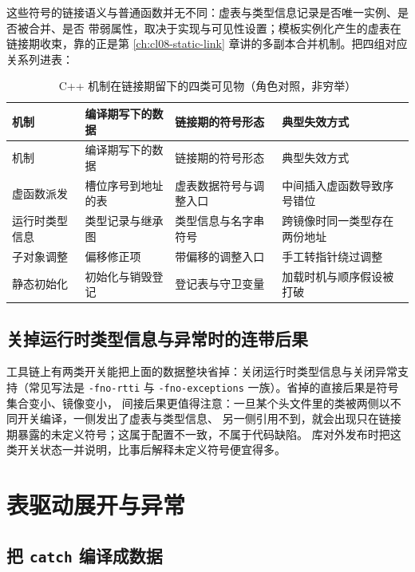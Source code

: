 \documentclass[12pt,a4paper,fontset=fandol]{ctexbook}
\newcommand{\Tp}[1]{\texttt{#1}}
\newcommand{\Lang}[1]{\textsf{#1}}
\newcommand{\CPP}{\Lang{C++}}
\newcommand{\Sw}[1]{\texttt{#1}}
\begin{document}
这些符号的链接语义与普通函数并无不同：虚表与类型信息记录是否唯一实例、是否被合并、是否
带弱属性，取决于实现与可见性设置；模板实例化产生的虚表在链接期收束，靠的正是第
\ref{ch:cl08-static-link} 章讲的多副本合并机制。把四组对应关系列进表：

\begin{longtable}{@{}>{\raggedright\arraybackslash}p{} >{\raggedright\arraybackslash}p{} >{\raggedright\arraybackslash}p{} >{\raggedright\arraybackslash}p{}@{}}
\caption{\CPP{} 机制在链接期留下的四类可见物（角色对照，非穷举）}\label{tab:cl13-linkface}\\
\toprule
机制 & 编译期写下的数据 & 链接期的符号形态 & 典型失效方式 \\
\midrule
\endfirsthead
\toprule
机制 & 编译期写下的数据 & 链接期的符号形态 & 典型失效方式 \\
\midrule
\endhead
\bottomrule
\endfoot
虚函数派发 & 槽位序号到地址的表 & 虚表数据符号与调整入口 & 中间插入虚函数导致序号错位 \\
运行时类型信息 & 类型记录与继承图 & 类型信息与名字串符号 & 跨镜像时同一类型存在两份地址 \\
子对象调整 & 偏移修正项 & 带偏移的调整入口 & 手工转指针绕过调整 \\
静态初始化 & 初始化与销毁登记 & 登记表与守卫变量 & 加载时机与顺序假设被打破 \\
\end{longtable}

\subsection{关掉运行时类型信息与异常时的连带后果}\label{sec:cl13-no-rtti}

工具链上有两类开关能把上面的数据整块省掉：关闭运行时类型信息与关闭异常支持（常见写法是
\Sw{-fno-rtti} 与 \Sw{-fno-exceptions} 一族）。省掉的直接后果是符号集合变小、镜像变小，
间接后果更值得注意：一旦某个头文件里的类被两侧以不同开关编译，一侧发出了虚表与类型信息、
另一侧引用不到，就会出现只在链接期暴露的未定义符号；这属于配置不一致，不属于代码缺陷。
库对外发布时把这类开关状态一并说明，比事后解释未定义符号便宜得多。

\section{表驱动展开与异常}\label{sec:cl13-unwind}

\subsection{把 \Tp{catch} 编译成数据}\label{sec:cl13-lsda}
\end{document}
